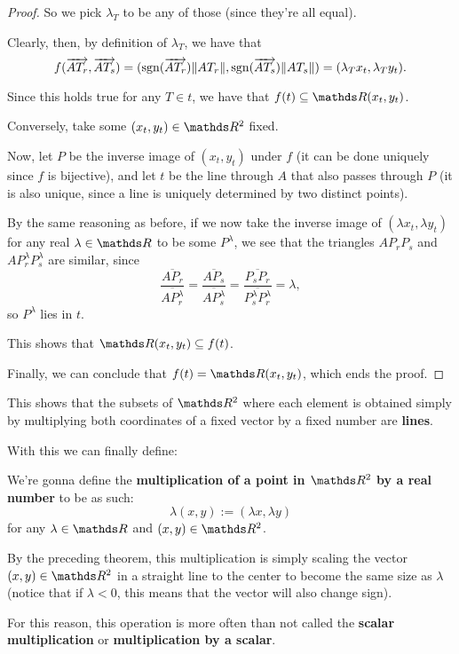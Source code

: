\begin{proof}
	So we pick $\lambda_T$ to be any of those (since they're all equal).
	
	Clearly, then, by definition of $\lambda_T$, we have that $$f(\overrightarrow{AT_r},\overrightarrow{AT_s})=(\mathrm{sgn}(\overrightarrow{AT_r})\lVert AT_r\rVert,\mathrm{sgn}(\overrightarrow{AT_s})\lVert AT_s\rVert)=(\lambda_Tx_t,\lambda_Ty_t).$$
	
	Since this holds true for any $T\in t$, we have that $f(t)\subseteq \R(x_t,y_t)$.
	
	\bigskip
	Conversely, take some $(x_t,y_t)\in\R^2$ fixed.
	
	Now, let $P$ be the inverse image of $(x_t,y_t)$ under $f$ (it can be done uniquely since $f$ is bijective), and let $t$ be the line through $A$ that also passes through $P$ (it is also unique, since a line is uniquely determined by two distinct points).
	
	By the same reasoning as before, if we now take the inverse image of $(\lambda x_t,\lambda y_t)$ for any real $\lambda\in \R$ to be some $P^\lambda$, we see that the triangles $AP_rP_s$ and $AP^\lambda_rP^\lambda_s$ are similar, since 
	\[\frac{\overline{AP_r}}{\overline{AP^\lambda_r}}=\frac{\overline{AP_s}}{\overline{AP^\lambda_s}}=\frac{\overline{P_sP_r}}{\overline{P^\lambda_sP^\lambda_r}}=\lambda,\]so $P^\lambda$ lies in $t$.
	
	This shows that $\R(x_t,y_t)\subseteq f(t)$.
	
	Finally, we can conclude that $f(t)=\R(x_t,y_t)$, which ends the proof.
\end{proof}

This shows that the subsets of $\R^2$ where each element is obtained simply by multiplying both coordinates of a fixed vector by a fixed number are \textbf{lines}.

With this we can finally define:

\begin{df}
	We're gonna define the \textbf{multiplication of a point in $\R^2$ by a real number} to be as such:
	\[\lambda(x,y):=(\lambda x,\lambda y)\]for any $\lambda\in \R$ and $(x,y)\in\R^2$.
\end{df}

\begin{rmk}
	By the preceding theorem, this multiplication is simply scaling the vector $(x,y)\in\R^2$ in a straight line to the center to become the same size as $\lambda$ (notice that if $\lambda <0$, this means that the vector will also change sign).
	
	For this reason, this operation is more often than not called the \textbf{scalar multiplication} or \textbf{multiplication by a scalar}.
\end{rmk}

